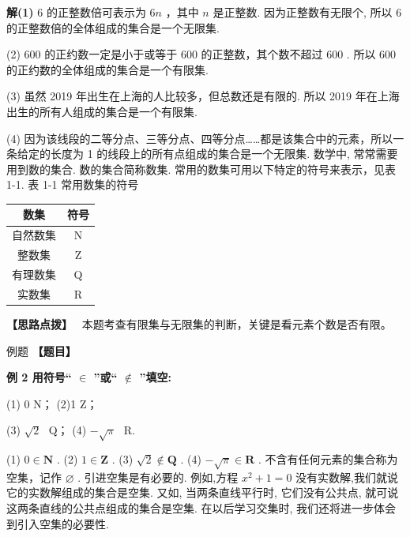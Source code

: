\documentclass[a4paper,10pt,oneside,fontset=none]{ctexbook}
\newcommand{\fillin}[1][2cm]{\,\underline{\hspace{#1}}\,}
\newcounter{example}[chapter]
\newenvironment{example}[1][]{\begin{exBox}{例题}{#1}}{\end{exBox}}
\numberwithin{equation}{chapter}
\newenvironment{solution}{\begin{solutionBox}}{\end{solutionBox}}
\newenvironment{hint}{\begin{hintBox}\textbf{【思路点拨】}~}{\end{hintBox}}
\begin{document}
\begin{solution}
\textbf{解(1)} 6 的正整数倍可表示为 ${6n}$ ，其中 $n$ 是正整数. 因为正整数有无限个, 所以 6 的正整数倍的全体组成的集合是一个无限集.
\par
(2) 600 的正约数一定是小于或等于 600 的正整数，其个数不超过 600 . 所以 600 的正约数的全体组成的集合是一个有限集.
\par
(3) 虽然 2019 年出生在上海的人比较多，但总数还是有限的. 所以 2019 年在上海出生的所有人组成的集合是一个有限集.
\par
(4) 因为该线段的二等分点、三等分点、四等分点……都是该集合中的元素，所以一条给定的长度为 1 的线段上的所有点组成的集合是一个无限集.
数学中, 常常需要用到数的集合. 数的集合简称数集. 常用的数集可用以下特定的符号来表示，见表 1-1.
表 1-1 常用数集的符号
\begin{center}
\begin{tabular}{|c|c|}
\hline
数集 & 符号 \\\hline
自然数集 & N \\
整数集 & Z \\
有理数集 & Q \\
实数集 & R \\
\hline
\end{tabular}
\end{center}
\end{solution}

\begin{hint}
本题考查有限集与无限集的判断，关键是看元素个数是否有限。
\end{hint}

\begin{example}
\textbf{【题目】}\par\vspace{0.3em}
\textbf{例 2 用符号“ $\in$ ”或“ $\notin$ ”填空:}\par\vspace{0.3em}
\par
(1) 0\fillin[2cm]N； (2)1\fillin[2cm]Z；
\par
(3)  $\sqrt{2}$ \fillin[2cm]Q； (4) $- \sqrt{\pi }$ \fillin[2cm]R.
\end{example}

\begin{solution}
\par
(1)  $0 \in  \mathbf{N}$ . (2) $1 \in  \mathbf{Z}$ . (3) $\sqrt{2} \notin  \mathbf{Q}$ . (4) $- \sqrt{\pi } \in  \mathbf{R}$ .
不含有任何元素的集合称为空集，记作 $\varnothing$ . 引进空集是有必要的. 例如,方程 ${x}^{2} + 1 = 0$ 没有实数解,我们就说它的实数解组成的集合是空集. 又如, 当两条直线平行时, 它们没有公共点, 就可说这两条直线的公共点组成的集合是空集. 在以后学习交集时, 我们还将进一步体会到引入空集的必要性.
\end{solution}
\end{document}
